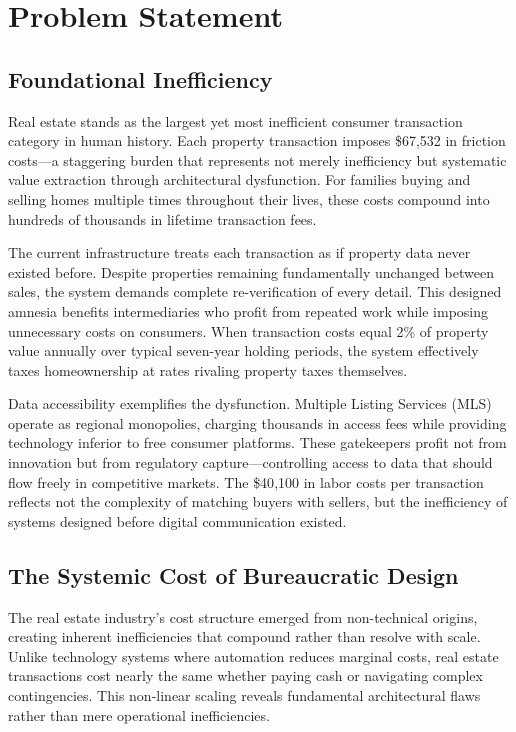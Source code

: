\chapter{Problem Statement}

\section{Foundational Inefficiency}

Real estate stands as the largest yet most inefficient consumer transaction category in human history. Each property transaction imposes \$67{,}532 in friction costs—a staggering burden that represents not merely inefficiency but systematic value extraction through architectural dysfunction. For families buying and selling homes multiple times throughout their lives, these costs compound into hundreds of thousands in lifetime transaction fees.

The current infrastructure treats each transaction as if property data never existed before. Despite properties remaining fundamentally unchanged between sales, the system demands complete re-verification of every detail. This designed amnesia benefits intermediaries who profit from repeated work while imposing unnecessary costs on consumers. When transaction costs equal 2\% of property value annually over typical seven-year holding periods, the system effectively taxes homeownership at rates rivaling property taxes themselves.

Data accessibility exemplifies the dysfunction. Multiple Listing Services (MLS) operate as regional monopolies, charging thousands in access fees while providing technology inferior to free consumer platforms. These gatekeepers profit not from innovation but from regulatory capture—controlling access to data that should flow freely in competitive markets. The \$40{,}100 in labor costs per transaction reflects not the complexity of matching buyers with sellers, but the inefficiency of systems designed before digital communication existed.

\section{The Systemic Cost of Bureaucratic Design}

The real estate industry's cost structure emerged from non-technical origins, creating inherent inefficiencies that compound rather than resolve with scale. Unlike technology systems where automation reduces marginal costs, real estate transactions cost nearly the same whether paying cash or navigating complex contingencies. This non-linear scaling reveals fundamental architectural flaws rather than mere operational inefficiencies.

